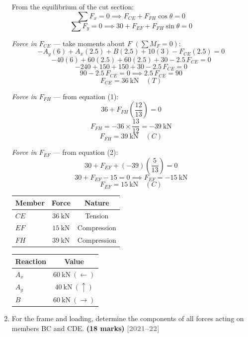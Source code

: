 \documentclass[12pt,a3paper]{article}
\newcommand{\yr}[1]{\hfill\textcolor{gray}{\small\textbf{[#1]}}}
\newcommand{\mk}[1]{\textcolor{orange!70!black}{\small\textbf{(#1 marks)}}}
\begin{document}
\begin{enumerate}
\begin{tcolorbox}[enhanced,breakable,ansbox,colback=cE!4,colframe=cE,
  boxrule=0.8pt,arc=5pt,
  title={\textbf{Solution}},fonttitle=\bfseries\color{white},
  colbacktitle=cE]
From the equilibrium of the cut section:
\[
  \sum F_x = 0 \implies F_{CE} + F_{FH}\cos\theta = 0 \tag{1}
\]
\[
  \sum F_y = 0 \implies 30 + F_{EF} + F_{FH}\sin\theta = 0 \tag{2}
\]

\medskip
\textit{Force in $F_{CE}$} — take moments about $F$
$\left(\sum M_F = 0\right)$:
\[
  -A_y(6) + A_x(2.5) + B(2.5) + 10(3) - F_{CE}(2.5) = 0
\]
\[
  -40(6) + 60(2.5) + 60(2.5) + 30 - 2.5\,F_{CE} = 0
\]
\[
  -240 + 150 + 150 + 30 - 2.5\,F_{CE} = 0
\]
\[
  90 - 2.5\,F_{CE} = 0
  \implies 2.5\,F_{CE} = 90
\]
\[
  \boxed{F_{CE} = 36\ \text{kN} \quad (T)}
\]

\medskip
\textit{Force in $F_{FH}$} — from equation (1):
\[
  36 + F_{FH}\left(\frac{12}{13}\right) = 0
\]
\[
  F_{FH} = -36 \times \frac{13}{12} = -39\ \text{kN}
\]
\[
  \boxed{F_{FH} = 39\ \text{kN} \quad (C)}
\]

\medskip
\textit{Force in $F_{EF}$} — from equation (2):
\[
  30 + F_{EF} + (-39)\left(\frac{5}{13}\right) = 0
\]
\[
  30 + F_{EF} - 15 = 0 \implies F_{EF} = -15\ \text{kN}
\]
\[
  \boxed{F_{EF} = 15\ \text{kN} \quad (C)}
\]

\medskip
\begin{center}
\renewcommand{\arraystretch}{1.4}
\begin{tabular}{lcc}
  \hline
  \textbf{Member} & \textbf{Force} & \textbf{Nature} \\
  \hline
  $CE$ & $36\ \text{kN}$ & Tension \\
  $EF$ & $15\ \text{kN}$ & Compression \\
  $FH$ & $39\ \text{kN}$ & Compression \\
  \hline
\end{tabular}
\end{center}

\medskip
\begin{center}
\renewcommand{\arraystretch}{1.4}
\begin{tabular}{lc}
  \hline
  \textbf{Reaction} & \textbf{Value} \\
  \hline
  $A_x$ & $60\ \text{kN}\ (\leftarrow)$ \\
  $A_y$ & $40\ \text{kN}\ (\uparrow)$   \\
  $B$   & $60\ \text{kN}\ (\rightarrow)$\\
  \hline
\end{tabular}
\end{center}

\end{tcolorbox}

\item \label{qlabel:B2-Q7}
For the frame and loading, determine the components of all forces acting on members BC and CDE. \mk{18}
\yr{2021--22}


\end{enumerate}
\end{document}
